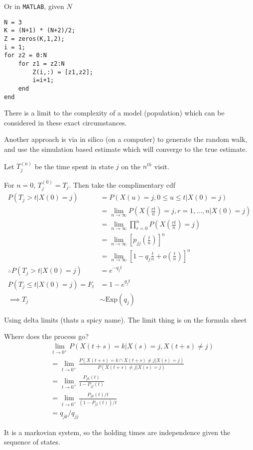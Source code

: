 \documentclass{/home/janmebows/Documents/LatexTemplates/myassignment}
\begin{document}
Or in \verb|MATLAB|, given $N$

\begin{verbatim}
N = 3
K = (N+1) * (N+2)/2;
Z = zeros(K,1,2);
i = 1;
for z2 = 0:N
    for z1 = z2:N
        Z(i,:) = [z1,z2];
        i=i+1;
    end
end
\end{verbatim}



There is a limit to the complexity of a model (population) which can be considered in these exact circumstances.


Another approach is via in silico (on a computer) to generate the random walk, and use the simulation based estimate which will converge to the true estimate.


Let $T_j^{(n)}$ be the time spent in state $j$ on the $n^{th}$ visit.

For $n=0$, $T_j^{(0)} = T_j$. Then take the complimentary cdf
\begin{align*}
P(T_j > t | X(0)=j) &= P(X(u) = j, 0 \leq u \leq t | X(0)=j)\\
&= \lim_{n\to\infty} P(X(\frac{rt}{n}) = j, r=1,\hdots,n |X(0) = j)\\
&= \lim_{n\to\infty} \prod_{r=0}^n P(X(\frac{rt}{n})= j)\\
&=\lim_{n\to\infty} [p_{jj}(\frac tn)]^{n}\\
&=\lim_{n\to\infty} [1- q_j \frac tn + o(\frac tn) ]^{n}\\
\therefore P(T_j > t |X(0) = j)  &= e^{-q_jt}\\
P(T_j \leq t | X(0) =j) = F_t &= 1-e^{q_j t}\\
\implies T_j&\sim \text{Exp}(q_j)
\end{align*}

Using delta limits (thats a spicy name). The limit thing is on the formula sheet

Where does the process go?
\begin{align*}
    &\lim_{t\to0^+} P(X(t+s)=k | X(s) = j, X(t+s)\neq j)\\
    &=\lim_{t\to0^+}  \frac{P(X(t+s)=k\cap X(t+s)\neq j | X(s) = j)}{P(X(t+s)\neq j | X(s)=j)}\\
    &=\lim_{t\to0^+}  \frac{P_{jk}(t)}{1-P_{jj}(t)}\\
    &=\lim_{t\to0^+}  \frac{P_{jk}(t)/t}{(1-P_{jj}(t))/t}\\
    &=q_{jk}/q_{jj}
\end{align*}

It is a markovian system, so the holding times are independence given the sequence of states.
\end{document}
